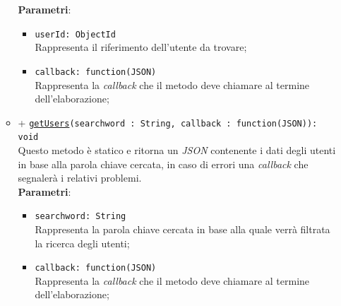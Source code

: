 \begin{itemize}
\begin{itemize}
			\textbf{Parametri}: 
			\begin{itemize}
				\item	
					\texttt{userId: ObjectId} \\
					Rappresenta il riferimento dell'utente da trovare;	
				\item	
					\texttt{callback: function(JSON)} \\
					Rappresenta la \textit{callback} che il metodo deve chiamare al termine dell'elaborazione;		
			\end{itemize}
		\item			
		+ \texttt{\underline{getUsers}(searchword : String, callback : function(JSON)): void}	\\	
		Questo metodo è statico e ritorna un \textit{JSON} contenente i dati degli utenti in base alla parola chiave cercata, in caso di errori una \textit{callback} che segnalerà i relativi problemi.\\
		\textbf{Parametri}: 
			\begin{itemize}
			\item	
				\texttt{searchword: String} \\
				Rappresenta la parola chiave cercata in base alla quale verrà filtrata la ricerca degli utenti;	
			\item	
				\texttt{callback: function(JSON)} \\
				Rappresenta la \textit{callback} che il metodo deve chiamare al termine dell'elaborazione;	
			\end{itemize}
		\end{itemize}	
\end{itemize}